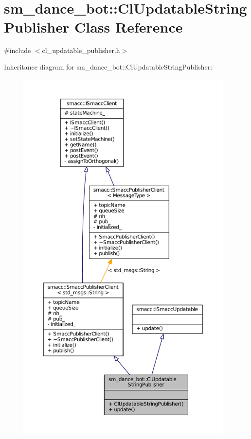 \hypertarget{classsm__dance__bot_1_1ClUpdatableStringPublisher}{}\section{sm\+\_\+dance\+\_\+bot\+:\+:Cl\+Updatable\+String\+Publisher Class Reference}
\label{classsm__dance__bot_1_1ClUpdatableStringPublisher}


{\ttfamily \#include $<$cl\+\_\+updatable\+\_\+publisher.\+h$>$}



Inheritance diagram for sm\+\_\+dance\+\_\+bot\+:\+:Cl\+Updatable\+String\+Publisher\+:
\nopagebreak
\begin{figure}[H]
\begin{center}
\leavevmode
\includegraphics[height=550pt]{classsm__dance__bot_1_1ClUpdatableStringPublisher__inherit__graph}
\end{center}
\end{figure}


